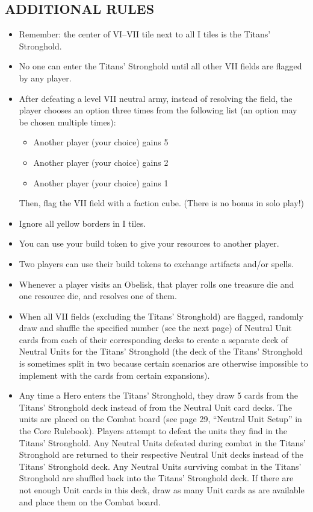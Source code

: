\begin{multicols*}{2}
\subsection*{\MakeUppercase{Additional Rules}}
\begin{itemize}
  \item Remember: the center of VI--VII tile next to all I tiles is the Titans' Stronghold.
  \item No one can enter the Titans' Stronghold until all other VII fields are flagged by any player.
  \item After defeating a level VII neutral army, instead of resolving the field, the player chooses an option three times from the following list (an option may be chosen multiple times):
    \begin{itemize}
      \item Another player (your choice) gains 5\,
      \item Another player (your choice) gains 2\,
      \item Another player (your choice) gains 1\,
    \end{itemize}
  Then, flag the VII field with a faction cube.
  (There is no bonus in solo play!)
  \item Ignore all yellow borders in I tiles.
  \item You can use your build token to give your resources to another player.
  \item Two players can use their build tokens to exchange artifacts and/or spells.
  \item Whenever a player visits an Obelisk, that player rolls one treasure die and one resource die, and resolves one of them.
  \item When all VII fields (excluding the Titans' Stronghold) are flagged, randomly draw and shuffle the specified number (see the next page) of Neutral Unit cards from each of their corresponding decks to create a separate deck of Neutral Units for the Titans' Stronghold (the deck of the Titans' Stronghold is sometimes split in two because certain scenarios are otherwise impossible to implement with the cards from certain expansions).
  \item Any time a Hero enters the Titans' Stronghold, they draw 5 cards from the Titans' Stronghold deck instead of from the Neutral Unit card decks. The units are placed on the Combat board (see page 29, ``Neutral Unit Setup'' in the Core Rulebook). Players attempt to defeat the units they find in the Titans' Stronghold. Any Neutral Units defeated during combat in the Titans' Stronghold are returned to their respective Neutral Unit decks instead of the Titans' Stronghold deck. Any Neutral Units surviving combat in the Titans' Stronghold are shuffled back into the Titans' Stronghold deck. If there are not enough Unit cards in this deck, draw as many Unit cards as are available and place them on the Combat board.

\end{itemize}
\end{multicols*}
